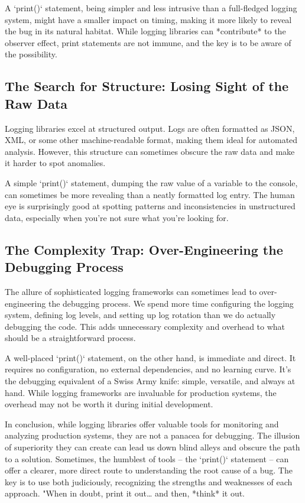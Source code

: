 \documentclass{article}
\begin{document}
{{{{A `print()` statement, being simpler and less intrusive than a full-fledged logging system, might have a smaller impact on timing, making it more likely to reveal the bug in its natural habitat. While logging libraries can *contribute* to the observer effect, print statements are not immune, and the key is to be aware of the possibility.

\subsection*{The Search for Structure: Losing Sight of the Raw Data}

Logging libraries excel at structured output. Logs are often formatted as JSON, XML, or some other machine-readable format, making them ideal for automated analysis. However, this structure can sometimes obscure the raw data and make it harder to spot anomalies.

A simple `print()` statement, dumping the raw value of a variable to the console, can sometimes be more revealing than a neatly formatted log entry. The human eye is surprisingly good at spotting patterns and inconsistencies in unstructured data, especially when you're not sure what you're looking for.

\subsection*{The Complexity Trap: Over-Engineering the Debugging Process}

The allure of sophisticated logging frameworks can sometimes lead to over-engineering the debugging process. We spend more time configuring the logging system, defining log levels, and setting up log rotation than we do actually debugging the code. This adds unnecessary complexity and overhead to what should be a straightforward process.

A well-placed `print()` statement, on the other hand, is immediate and direct. It requires no configuration, no external dependencies, and no learning curve. It's the debugging equivalent of a Swiss Army knife: simple, versatile, and always at hand. While logging frameworks are invaluable for production systems, the overhead may not be worth it during initial development.

In conclusion, while logging libraries offer valuable tools for monitoring and analyzing production systems, they are not a panacea for debugging. The illusion of superiority they can create can lead us down blind alleys and obscure the path to a solution. Sometimes, the humblest of tools – the `print()` statement – can offer a clearer, more direct route to understanding the root cause of a bug. The key is to use both judiciously, recognizing the strengths and weaknesses of each approach. "When in doubt, print it out… and then, *think* it out.

}}}}
\end{document}
